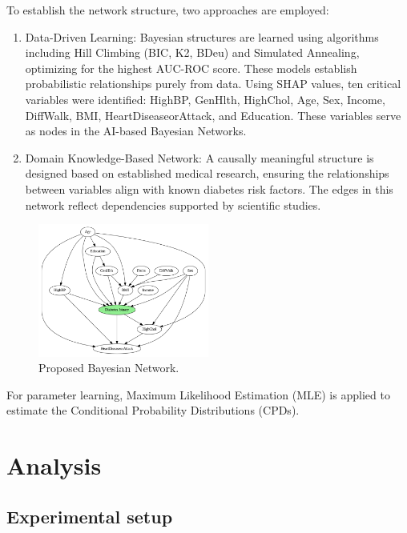 \documentclass[letterpaper]{article}
\begin{document}
 To establish the network structure, two approaches are employed:
\begin{enumerate}
	\item Data-Driven Learning: Bayesian structures are learned using algorithms including Hill Climbing (BIC, K2, BDeu) and Simulated Annealing, optimizing for the highest AUC-ROC score. These models establish probabilistic relationships purely from data. Using SHAP values, ten critical variables were identified: HighBP, GenHlth, HighChol, Age, Sex, Income, DiffWalk, BMI, HeartDiseaseorAttack, and Education. These variables serve as nodes in the AI-based Bayesian Networks.
	\item Domain Knowledge-Based Network: A causally meaningful structure is designed based on established medical research, ensuring the relationships between variables align with known diabetes risk factors. The edges in this network reflect dependencies supported by scientific studies.
\end{enumerate}

\begin{figure}[ht]
	\centering
	\includegraphics[width=0.5\textwidth]{images/bn-domain-knowledge.png}
	\caption{Proposed Bayesian Network.} 
	\label{fig:model}
\end{figure}

For parameter learning, Maximum Likelihood Estimation (MLE) is applied to estimate the Conditional Probability Distributions (CPDs).


\section{Analysis}

\subsection{Experimental setup}
\end{document}
